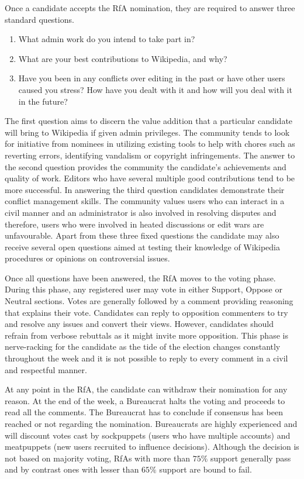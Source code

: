 Once a candidate accepts the RfA nomination, they are required to answer three standard questions. 
\begin{enumerate}
    \item What admin work do you intend to take part in?
    \item What are your best contributions to Wikipedia, and why?
    \item Have you been in any conflicts over editing in the past or have other users caused you stress? How have you dealt with it and how will you deal with it in the future?
\end{enumerate}
The first question aims to discern the value addition that a particular candidate will bring to Wikipedia if given admin privileges.
The community tends to look for initiative from nominees in utilizing existing tools to help with chores such as reverting errors, identifying vandalism or copyright infringements.
The answer to the second question provides the community the candidate's achievements and quality of work.
Editors who have several multiple good contributions tend to be more successful.
In answering the third question candidates demonstrate their conflict management skills.
The community values users who can interact in a civil manner and an administrator is also involved in resolving disputes and therefore, users who were involved in heated discussions or edit wars are unfavourable.
Apart from these three fixed questions the candidate may also receive several open questions aimed at testing their knowledge of Wikipedia procedures or opinions on controversial issues.

Once all questions have been answered, the RfA moves to the voting phase.
During this phase, any registered user may vote in either Support, Oppose or Neutral sections.
Votes are generally followed by a comment providing reasoning that explains their vote.
Candidates can reply to opposition commenters to try and resolve any issues and convert their views.
However, candidates should refrain from verbose rebuttals as it might invite more opposition.
This phase is nerve-racking for the candidate as the tide of the election changes constantly throughout the week and it is not possible to reply to every comment in a civil and respectful manner.

At any point in the RfA, the candidate can withdraw their nomination for any reason.
At the end of the week, a Bureaucrat halts the voting and proceeds to read all the comments.
The Bureaucrat has to conclude if consensus has been reached or not regarding the nomination.
Bureaucrats are highly experienced and will discount votes cast by sockpuppets (users who have multiple accounts) and meatpuppets (new users recruited to influence decisions).
Although the decision is not based on majority voting, RfAs with more than $75\%$ support generally pass and by contrast ones with lesser than $65\%$ support are bound to fail.  

